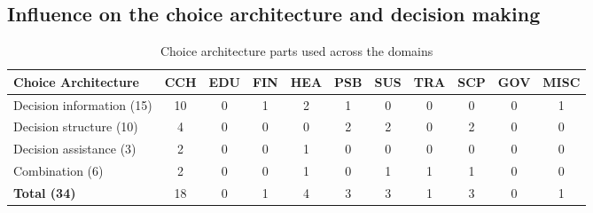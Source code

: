 
\subsection{Influence on the choice architecture and decision making}


\begin{table}[htbp]
\centering
\small
\begin{tabular}{p{3.5cm}|cccccccccc}
\textbf{Choice Architecture} & \textbf{CCH} & \textbf{EDU} & \textbf{FIN} & \textbf{HEA} & \textbf{PSB} & \textbf{SUS} & \textbf{TRA} & \textbf{SCP} & \textbf{GOV} & \textbf{MISC} \\ \hline
Decision information (15) & 10 & 0 & 1 & 2 & 1 & 0 & 0 & 0 & 0 & 1 \\
Decision structure (10) & 4 & 0 & 0 & 0 & 2 & 2 & 0 & 2 & 0 & 0 \\
Decision assistance (3) & 2 & 0 & 0 & 1 & 0 & 0 & 0 & 0 & 0 & 0 \\
Combination (6) & 2 & 0 & 0 & 1 & 0 & 1 & 1 & 1 & 0 & 0 \\ \hline
\textbf{Total (34)} & 18 & 0 & 1 & 4 & 3 & 3 & 1 & 3 & 0 & 1
\end{tabular}
\caption{Choice architecture parts used across the domains}
\label{tabel:choice-arch-domains}
\end{table}

